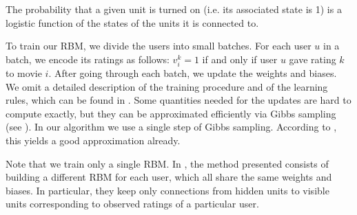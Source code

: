 \documentclass[10pt,conference,compsocconf]{IEEEtran}
\begin{document}
	The probability that a given unit is turned on (i.e. its associated state is 1) is a logistic function of the states of the units it is connected to. 
	
	
	To train our RBM, we divide the users into small batches. For each user $u$ in a batch, we encode its ratings as follows: $v^k_i=1$ if and only if user $u$ gave rating $k$ to movie $i$. After going through each batch, we update the weights and biases. We omit a detailed description of the training procedure and of the learning rules, which can be found in \cite{L10}. Some quantities needed for the updates are hard to compute exactly, but they can be approximated efficiently via Gibbs sampling (see \cite{H02}). In our algorithm we use a single step of Gibbs sampling. According to \cite{L10}, this yields a good approximation already.
	
%	
	
	Note that we train only a single RBM. In \cite{SMH07}, the method presented consists of building a different RBM for each user, which all share the same weights and biases. In particular, they keep only connections from hidden units to visible units corresponding to observed ratings of a particular user.
	
\end{document}
